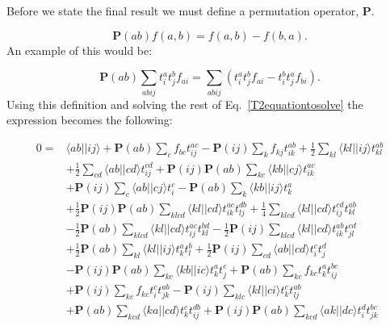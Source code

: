 \documentclass[graybox,sectrefs,envcountresetchap,open=right]{svmonodo}
\begin{document}
Before we state the final result we must define a permutation operator, $\mathbf{P}$.

\begin{equation}
\mathbf{P}(ab) f(a,b) = f(a,b) - f(b,a) .
\end{equation} 
An example of this would be:

\begin{equation}
\mathbf{P}(ab) \sum_{abij} t_i^a t_j^b f_{ai} = \sum_{abij} \left( t_i^a t_j^b f_{ai} - t_i^b t_j^a f_{bi} \right) .
\end{equation} 
Using this definition and solving the rest of Eq.~\ref{T2equationtosolve} the expression becomes the following:

\begin{align}
0 = & \langle ab || ij \rangle
+ \mathbf{P}(ab) \sum_c f_{bc} t_{ij}^{ac}
- \mathbf{P}(ij) \sum_k f_{kj} t_{ik}^{ab}
+ \frac{1}{2} \sum_{kl} \langle kl||ij \rangle t_{kl}^{ab} \label{T2equation} \\ &
+ \frac{1}{2} \sum_{cd} \langle ab || cd \rangle t_{ij}^{cd}
+ \mathbf{P}(ij) \mathbf{P}(ab) \sum_{kc}
\langle kb||cj \rangle t_{ik}^{ac} \nonumber \\ &
+ \mathbf{P}(ij) \sum_c \langle ab || cj \rangle t_i^c
- \mathbf{P}(ab) \sum_k \langle kb || ij \rangle t_k^a
\nonumber \\ &
+ \frac{1}{2} \mathbf{P}(ij) \mathbf{P}(ab) \sum_{klcd}
\langle kl || cd \rangle t_{ik}^{ac} t_{lj}^{db} 
+ \frac{1}{4} \sum_{klcd} \langle kl || cd \rangle
t_{ij}^{cd} t_{kl}^{ab} \nonumber \\ &
-  \frac{1}{2} \mathbf{P}(ab)\sum_{klcd} \langle kl || cd \rangle t_{ij}^{ac} t_{kl}^{bd}
- \frac{1}{2} \mathbf{P}(ij) \sum_{klcd} \langle kl || cd \rangle t_{ik}^{ab} t_{jl}^{cd} \nonumber \\ &
+ \frac{1}{2} \mathbf{P}(ab) \sum_{kl}
\langle kl || ij \rangle t_k^a t_l^b 
+ \frac{1}{2} \mathbf{P}(ij) \sum_{cd} \langle ab || cd \rangle t_i^c t_j^d \nonumber \\ &
- \mathbf{P}(ij) \mathbf{P}(ab) \sum_{kc} \langle kb || ic \rangle t_k^a t_j^c
+  \mathbf{P}(ab) \sum_{kc} f_{kc} t_k^a t_{ij}^{bc} 
\nonumber \\ &
+ \mathbf{P}(ij) \sum_{kc} f_{kc} t_i^c t_{jk}^{ab}
- \mathbf{P}(ij) \sum_{klc} \langle kl || ci \rangle t_k^c t_{lj}^{ab}  \nonumber \\ &
+ \mathbf{P} (ab) \sum_{kcd} \langle ka || cd \rangle t_k^c t_{ij}^{db} 
+ \mathbf{P}(ij) \mathbf{P}(ab) \sum_{kcd} \langle ak || dc \rangle t_i^d t_{jk}^{bc} \nonumber \\ &

\end{align}
\end{document}
